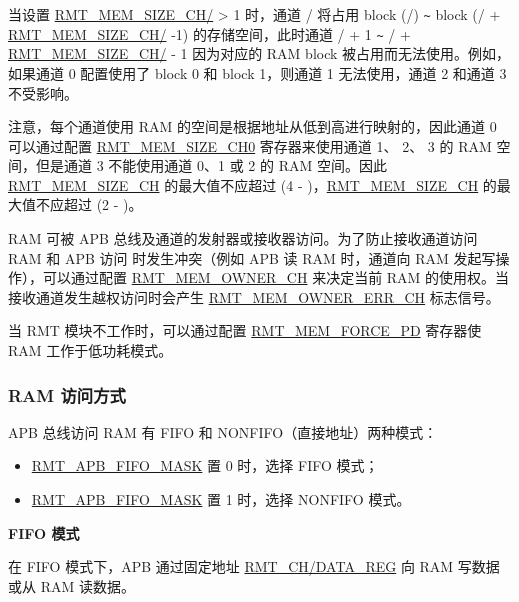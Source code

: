 \documentclass[main\_\_CN.tex]{subfiles}
\begin{document}
当设置 \hyperref[fielddesc:RMTMEMSIZECHN]{RMT\_MEM\_SIZE\_CH/} > 1 时，通道 / 将占用 block (/) \verb+~+ block (/ + \hyperref[fielddesc:RMTMEMSIZECHN]{RMT\_MEM\_SIZE\_CH/} -1) 的存储空间，此时通道 / + 1 \verb+~+ / + \hyperref[fielddesc:RMTMEMSIZECHN]{RMT\_MEM\_SIZE\_CH/} - 1 因为对应的 RAM block 被占用而无法使用。例如，如果通道 0 配置使用了 block 0 和 block 1，则通道 1 无法使用，通道 2 和通道 3 不受影响。


注意，每个通道使用 RAM 的空间是根据地址从低到高进行映射的，因此通道 0 可以通过配置 \hyperref[fielddesc:RMTMEMSIZECHN]{RMT\_MEM\_SIZE\_CH0} 寄存器来使用通道 1、 2、 3 的 RAM 空间，但是通道 3 不能使用通道 0、1 或 2 的 RAM 空间。因此 \hyperref[fielddesc:RMTMEMSIZECHN]{RMT\_MEM\_SIZE\_CH} 的最大值不应超过 (4 - )，\hyperref[fielddesc:RMTMEMSIZECHM]{RMT\_MEM\_SIZE\_CH} 的最大值不应超过 (2 - )。

RAM 可被 APB 总线及通道的发射器或接收器访问。为了防止接收通道访问 RAM 和 APB 访问 时发生冲突（例如 APB 读 RAM 时，通道向 RAM 发起写操作），可以通过配置 \hyperref[fielddesc:RMTMEMOWNERCHM]{RMT\_MEM\_OWNER\_CH} 来决定当前 RAM 的使用权。当接收通道发生越权访问时会产生 \hyperref[fielddesc:RMTMEMOWNERERRCHM]{RMT\_MEM\_OWNER\_ERR\_CH} 标志信号。 

当 RMT 模块不工作时，可以通过配置 \hyperref[fielddesc:RMTMEMFORCEPD]{RMT\_MEM\_FORCE\_PD} 寄存器使 RAM 工作于低功耗模式。

\subsubsection{RAM 访问方式}
APB 总线访问 RAM 有 FIFO 和 NONFIFO（直接地址）两种模式：
\begin{itemize}
    \item \hyperref[fielddesc:RMTAPBFIFOMASK]{RMT\_APB\_FIFO\_MASK} 置 0 时，选择 FIFO 模式；
    \item \hyperref[fielddesc:RMTAPBFIFOMASK]{RMT\_APB\_FIFO\_MASK} 置 1 时，选择 NONFIFO 模式。
\end{itemize}

\textbf{FIFO 模式}

在 FIFO 模式下，APB 通过固定地址 \hyperref[regdesc:RMTCHNDATAREG]{RMT\_CH/DATA\_REG} 向 RAM 写数据或从 RAM 读数据。
\end{document}

